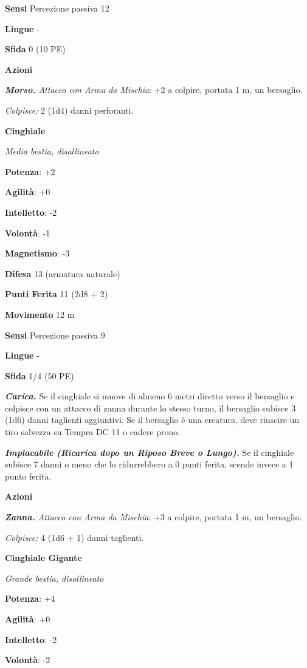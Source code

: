 \begin{multicols}{2}
\textbf{Sensi} Percezione passiva 12

\textbf{Lingue} -

\textbf{Sfida} 0 (10 PE)\smallskip

\smallskip\textbf{Azioni}

\emph{\textbf{Morso.} Attacco con Arma da Mischia}: +2 a colpire,
portata 1 m, un bersaglio.

\emph{Colpisce:} 2 (1d4) danni perforanti.

\textbf{Cinghiale}

\emph{Media bestia, disallineato}

\textbf{Potenza}: +2

\textbf{Agilità}: +0

\textbf{Intelletto}: -2

\textbf{Volontà}: -1

\textbf{Magnetismo}: -3

\textbf{Difesa} 13 (armatura naturale)

\textbf{Punti Ferita} 11 (2d8 + 2)

\textbf{Movimento} 12 m

\textbf{Sensi} Percezione passiva 9

\textbf{Lingue} -

\textbf{Sfida} 1/4 (50 PE)\smallskip

\emph{\textbf{Carica.}} Se il cinghiale si muove di almeno 6 metri
diretto verso il bersaglio e colpisce con un attacco di zanna durante lo
stesso turno, il bersaglio subisce 3 (1d6) danni taglienti aggiuntivi.
Se il bersaglio è una creatura, deve riuscire un tiro salvezza su Tempra
DC 11 o cadere prono.

\emph{\textbf{Implacabile (Ricarica dopo un Riposo Breve o Lungo).}} Se
il cinghiale subisce 7 danni o meno che lo ridurrebbero a 0 punti
ferita, scende invece a 1 punto ferita.

\smallskip\textbf{Azioni}

\emph{\textbf{Zanna.} Attacco con Arma da Mischia}: +3 a colpire,
portata 1 m, un bersaglio.

\emph{Colpisce:} 4 (1d6 + 1) danni taglienti.

\textbf{Cinghiale Gigante}

\emph{Grande bestia, disallineato}

\textbf{Potenza}: +4

\textbf{Agilità}: +0

\textbf{Intelletto}: -2

\textbf{Volontà}: -2


\end{multicols}
